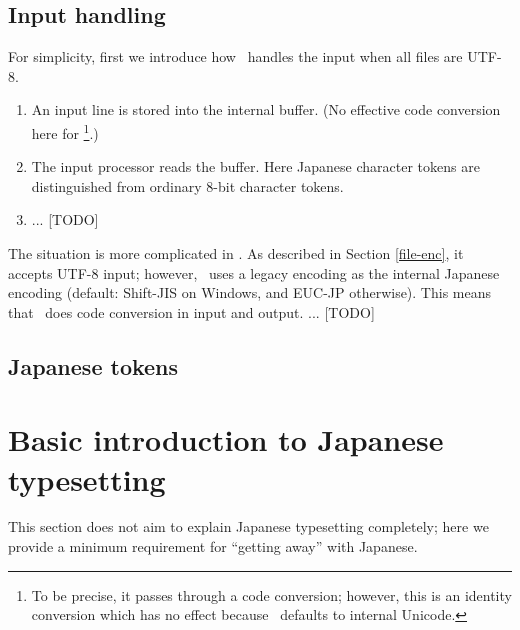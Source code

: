 \documentclass[a4paper,11pt,dvipdfmx]{article}
\begin{document}
\subsection{Input handling}

For simplicity, first we introduce how \upTeX\ handles the input
when all files are UTF-8.
\begin{enumerate}
 \item An input line is stored into the internal buffer.
   (No effective code conversion here for \upTeX\footnote{To be precise,
   it passes through a code conversion; however, this is an identity conversion
   which has no effect because \upTeX\ defaults to internal Unicode.}.)
 \item The input processor reads the buffer.
   Here Japanese character tokens are distinguished from
   ordinary 8-bit character tokens.
 \item ... [TODO]
\end{enumerate}

The situation is more complicated in \pTeX.
As described in Section \ref{file-enc}, it accepts UTF-8 input;
however, \pTeX\ uses a legacy encoding as the internal Japanese encoding
(default: Shift-JIS on Windows, and EUC-JP otherwise).
This means that \pTeX\ does code conversion in input and output.
... [TODO]

\subsection{Japanese tokens}


\section{Basic introduction to Japanese typesetting}

This section does not aim to explain Japanese typesetting completely;
here we provide a minimum requirement for ``getting away'' with Japanese.
\end{document}
